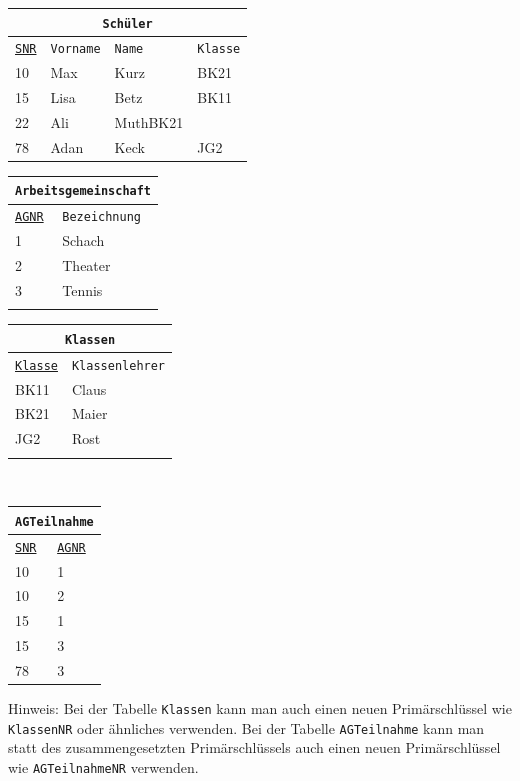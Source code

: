 \documentclass[a4paper,12pt, headsepline, ngerman]{scrartcl}
\begin{document}
	\begin{Answer}[ref=KANormalisieren]
		
		\begin{tabular}{llll}
			\multicolumn{4}{c}{\lstinline!Schüler!}\\
			\hline
			\underline{\lstinline!SNR!}&\lstinline!Vorname!&\lstinline!Name!&\lstinline!Klasse!\\
			\hline
			10&Max&Kurz&BK21\\
			15&Lisa&Betz&BK11\\
			22&Ali&MuthBK21\\
			78&Adan&Keck&JG2\\
		\end{tabular}
		\begin{tabular}{ll}
			\multicolumn{2}{c}{\lstinline!Arbeitsgemeinschaft!}\\
			\hline
			\underline{\lstinline!AGNR!}&\lstinline!Bezeichnung!\\
			\hline
			1&Schach\\
			2&Theater\\
			3&Tennis\\
			\phantom{ }&\\
		\end{tabular}
		\begin{tabular}{ll}
			\multicolumn{2}{c}{\lstinline!Klassen!}\\
			\hline
			\underline{\lstinline!Klasse!}&\lstinline!Klassenlehrer!\\
			\hline
			BK11&Claus\\
			BK21&Maier\\
			JG2&Rost\\
			\phantom{ }&\\
		\end{tabular}\\
		\begin{tabular}{ll}
			\multicolumn{2}{c}{\lstinline!AGTeilnahme!}\\
			\hline
			\underline{\lstinline!SNR!}&\underline{\lstinline!AGNR!}\\
			\hline
			10&1\\
			10&2\\
			15&1\\
			15&3\\
			78&3\\
		\end{tabular}
		\begin{minipage}{0.8\textwidth}
			Hinweis: Bei der Tabelle \lstinline!Klassen! kann man auch einen neuen Primärschlüssel wie \lstinline!KlassenNR! oder ähnliches verwenden. Bei der Tabelle \lstinline!AGTeilnahme! kann man statt des zusammengesetzten Primärschlüssels auch einen neuen Primärschlüssel wie \lstinline!AGTeilnahmeNR! verwenden.
		\end{minipage}
	\end{Answer}%
\end{document}
